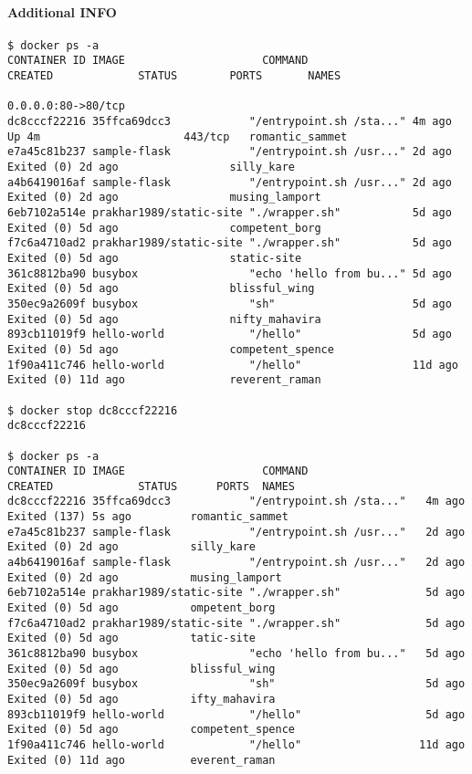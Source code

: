 \paragraph{Additional INFO}


\begin{lstlisting}[basicstyle=\tiny\ttfamily]
$ docker ps -a
CONTAINER ID IMAGE                     COMMAND                  CREATED             STATUS        PORTS       NAMES
                                                                                           0.0.0.0:80->80/tcp   
dc8cccf22216 35ffca69dcc3            "/entrypoint.sh /sta..." 4m ago Up 4m                      443/tcp   romantic_sammet
e7a45c81b237 sample-flask            "/entrypoint.sh /usr..." 2d ago    Exited (0) 2d ago                 silly_kare
a4b6419016af sample-flask            "/entrypoint.sh /usr..." 2d ago    Exited (0) 2d ago                 musing_lamport
6eb7102a514e prakhar1989/static-site "./wrapper.sh"           5d ago    Exited (0) 5d ago                 competent_borg
f7c6a4710ad2 prakhar1989/static-site "./wrapper.sh"           5d ago    Exited (0) 5d ago                 static-site
361c8812ba90 busybox                 "echo 'hello from bu..." 5d ago    Exited (0) 5d ago                 blissful_wing
350ec9a2609f busybox                 "sh"                     5d ago    Exited (0) 5d ago                 nifty_mahavira
893cb11019f9 hello-world             "/hello"                 5d ago    Exited (0) 5d ago                 competent_spence
1f90a411c746 hello-world             "/hello"                 11d ago   Exited (0) 11d ago                reverent_raman

$ docker stop dc8cccf22216
dc8cccf22216

$ docker ps -a
CONTAINER ID IMAGE                     COMMAND                  CREATED             STATUS      PORTS  NAMES
dc8cccf22216 35ffca69dcc3            "/entrypoint.sh /sta..."   4m ago     Exited (137) 5s ago         romantic_sammet
e7a45c81b237 sample-flask            "/entrypoint.sh /usr..."   2d ago     Exited (0) 2d ago           silly_kare
a4b6419016af sample-flask            "/entrypoint.sh /usr..."   2d ago     Exited (0) 2d ago           musing_lamport
6eb7102a514e prakhar1989/static-site "./wrapper.sh"             5d ago     Exited (0) 5d ago           ompetent_borg
f7c6a4710ad2 prakhar1989/static-site "./wrapper.sh"             5d ago     Exited (0) 5d ago           tatic-site
361c8812ba90 busybox                 "echo 'hello from bu..."   5d ago     Exited (0) 5d ago           blissful_wing
350ec9a2609f busybox                 "sh"                       5d ago     Exited (0) 5d ago           ifty_mahavira
893cb11019f9 hello-world             "/hello"                   5d ago     Exited (0) 5d ago           competent_spence
1f90a411c746 hello-world             "/hello"                  11d ago     Exited (0) 11d ago          everent_raman
\end{lstlisting}


